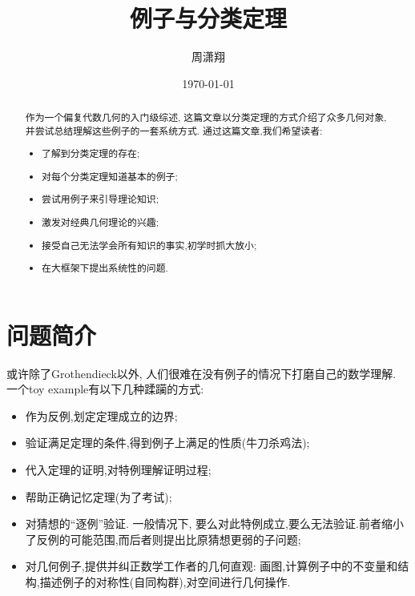 \documentclass[UTF8,12pt,twoside]{article}
\theoremstyle{definition}
\numberwithin{equation}{section}
\begin{document}
\title{\textbf{例子与分类定理}}
\author{周潇翔}
\date{\today}
\maketitle

\begin{abstract}
	
	
	作为一个偏复代数几何的入门级综述, 这篇文章以分类定理的方式介绍了众多几何对象, 并尝试总结理解这些例子的一套系统方式. 通过这篇文章,我们希望读者: 
	\begin{itemize}
		\setlength{\itemsep}{0pt}
		\setlength{\parsep}{0pt}
		\setlength{\parskip}{0pt}
		\item 了解到分类定理的存在;
		\item 对每个分类定理知道基本的例子;      
		\item 尝试用例子来引导理论知识;
		\item 激发对经典几何理论的兴趣;
		\item 接受自己无法学会所有知识的事实,初学时抓大放小;
		\item 在大框架下提出系统性的问题.
	\end{itemize}
\end{abstract}


\section{问题简介}

或许除了Grothendieck以外, 人们很难在没有例子的情况下打磨自己的数学理解. 一个toy example有以下几种蹂躏的方式: 
\begin{itemize}
	\setlength{\itemsep}{0pt}
	\setlength{\parsep}{0pt}
	\setlength{\parskip}{0pt}
	\item 作为反例,划定定理成立的边界;      
	\item 验证满足定理的条件,得到例子上满足的性质(牛刀杀鸡法);      
	\item 代入定理的证明,对特例理解证明过程;%
	\item 帮助正确记忆定理(为了考试);      
	\item 对猜想的“逐例”验证. 一般情况下, 要么对此特例成立,要么无法验证.前者缩小了反例的可能范围,而后者则提出比原猜想更弱的子问题;      
	\item 对几何例子,提供并纠正数学工作者的几何直观: 画图,计算例子中的不变量和结构,描述例子的对称性(自同构群),对空间进行几何操作. 
\end{itemize}
\end{document}

